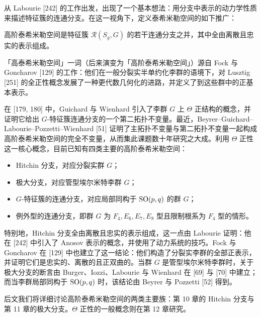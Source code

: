 从 Labourie [242] 的工作出发，出现了一个基本想法：用分支中表示的动力学性质来描述特征簇的连通分支。在这一视角下，定义泰希米勒空间的如下推广：

\begin{definition}[9.9] 高阶泰希米勒空间是特征簇 $\mathcal{R}(S_g,G)$ 的若干连通分支之并，其中全由离散且忠实的表示组成。\end{definition}

「高泰希米勒空间」一词（后来演变为「高阶泰希米勒空间」）源自 Fock 与 Goncharov [129] 的工作：他们在一般分裂实半单约化李群的语境下，对 Lusztig [251] 的全正性概念发展了一种更代数几何化的进路，并定义了到这些群中的正基本表示。

在 [179, 180] 中，Guichard 与 Wienhard 引入了李群 $G$ 上 $\Theta$ 正结构的概念，并证明它给出 $G$-特征簇连通分支的一个第二拓扑不变量。最近，Beyrer–Guichard–Labourie–Pozzetti–Wienhard [51] 证明了主拓扑不变量与第二拓扑不变量一起构成高阶泰希米勒空间的完全不变量，从而集此课题数十年研究之大成。利用 $\Theta$ 正性这一核心概念，目前已知有四类主要的高阶泰希米勒空间：
\begin{itemize}[leftmargin=2em]
\item Hitchin 分支，对应分裂实群 $G$；
\item 极大分支，对应管型埃尔米特李群 $G$；
\item $G$-特征簇的连通分支，对应局部同构于 $\operatorname{SO}(p,q)$ 的群 $G$；
\item 例外型的连通分支，即群 $G$ 为 $F_4,E_6,E_7,E_8$ 型且限制根系为 $F_4$ 型的情形。
\end{itemize}

特别地，Hitchin 分支全由离散且忠实的表示组成，这一点由 Labourie 证明：他在 [242] 中引入了 Anosov 表示的概念，并使用了动力系统的技巧。Fock 与 Goncharov 在 [129] 中也建立了这一结论：他们构造了分裂实李群的全部正表示，并证明它们是忠实的、离散的且正双曲的。当群 $G$ 是管型埃尔米特李群时，关于极大分支的断言由 Burger、Iozzi、Labourie 与 Wienhard 在 [69] 与 [70] 中建立；而当李群局部同构于 $\operatorname{SO}(p,q)$ 时，该结论由 Beyrer 与 Pozzetti [52] 得到。


后文我们将详细讨论高阶泰希米勒空间的两类主要族：第 10 章的 Hitchin 分支与第 11 章的极大分支。$\Theta$ 正性的一般概念则在第 12 章研究。
